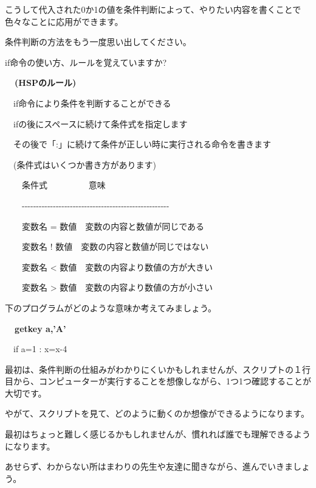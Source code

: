 \documentclass[a4paper,12pt]{jarticle}
\begin{document}
\bigskip

こうして代入された0か1の値を条件判断によって、やりたい内容を書くことで色々なことに応用ができます。

\clearpage

\bigskip

条件判断の方法をもう一度思い出してください。

if命令の使い方、ルールを覚えていますか?


\bigskip

{\bfseries
\ \ (HSPのルール)

\bigskip

\ \ if命令により条件を判断することができる

\ \ ifの後にスペースに続けて条件式を指定します

\ \ その後で「:」に続けて条件が正しい時に実行される命令を書きます}

\bigskip

\ \ (条件式はいくつか書き方があります)


\bigskip

\ \ \ \ 条件式 \ \ \ \ \ \ \ \ \ 意味

\ \ \ \ {}-{}-{}-{}-{}-{}-{}-{}-{}-{}-{}-{}-{}-{}-{}-{}-{}-{}-{}-{}-{}-{}-{}-{}-{}-{}-{}-{}-{}-{}-{}-{}-{}-{}-{}-{}-{}-{}-{}-{}-{}-{}-{}-{}-{}-{}-{}-{}-{}-{}-{}-{}-

\ \ \ \ 変数名 =
数値\ \ 変数の内容と数値が同じである

\ \ \ \ 変数名 !
数値\ \ 変数の内容と数値が同じではない

\ \ \ \ 変数名 {\textless}
数値\ \ 変数の内容より数値の方が大きい

\ \ \ \ 変数名 {\textgreater}
数値\ \ 変数の内容より数値の方が小さい


\bigskip

下のプログラムがどのような意味か考えてみましょう。


\bigskip

{\bfseries
\ \ getkey a,’A’

\ \ if a=1 : x=x-4}


\bigskip

最初は、条件判断の仕組みがわかりにくいかもしれませんが、スクリプトの１行目から、コンピューターが実行することを想像しながら、1つ1つ確認することが大切です。

やがて、スクリプトを見て、どのように動くのか想像ができるようになります。

最初はちょっと難しく感じるかもしれませんが、慣れれば誰でも理解できるようになります。

あせらず、わからない所はまわりの先生や友達に聞きながら、進んでいきましょう。
\end{document}
